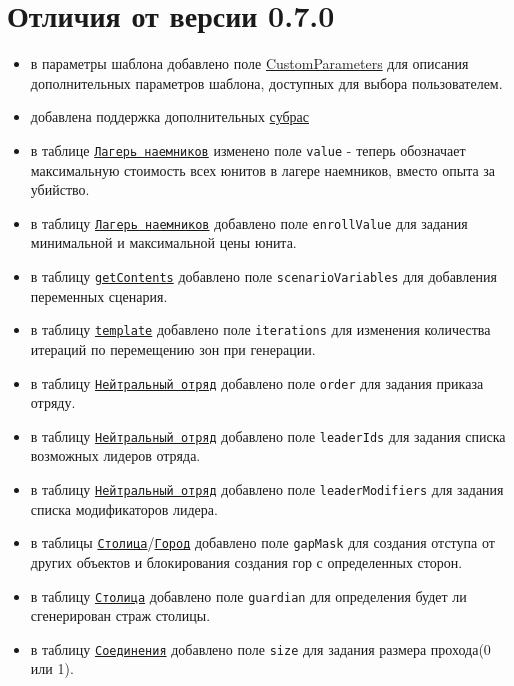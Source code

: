 \section{Отличия от версии 0.7.0}
\begin{itemize}
\item в параметры шаблона добавлено поле \hyperref[customParameters]{{CustomParameters}} для описания дополнительных параметров шаблона, доступных для выбора пользователем.
\item добавлена поддержка дополнительных \hyperref[subraceTypes]{субрас}
\item в таблице \hyperref[mercenary]{\texttt{Лагерь наемников}} изменено поле \texttt{value} - теперь обозначает максимальную стоимость всех юнитов в лагере наемников, вместо опыта за убийство.
\item в таблицу \hyperref[mercenary]{\texttt{Лагерь наемников}} добавлено поле \texttt{enrollValue} для задания минимальной и максимальной цены юнита.
\item в таблицу \hyperref[getContents]{\texttt{getContents}} добавлено поле \texttt{scenarioVariables} для добавления переменных сценария.
\item в таблицу \hyperref[template]{\texttt{template}} добавлено поле \texttt{iterations} для изменения количества итераций по перемещению зон при генерации.
\item в таблицу \hyperref[neutralStacks]{\texttt{Нейтральный отряд}} добавлено поле \texttt{order} для задания приказа отряду.
\item в таблицу \hyperref[neutralStacks]{\texttt{Нейтральный отряд}} добавлено поле \texttt{leaderIds} для задания списка возможных лидеров отряда.
\item в таблицу \hyperref[neutralStacks]{\texttt{Нейтральный отряд}} добавлено поле \texttt{leaderModifiers} для задания списка модификаторов лидера.
\item в таблицы \hyperref[capital]{\texttt{Столица}}/\hyperref[city]{\texttt{Город}} добавлено поле \texttt{gapMask} для создания отступа от других объектов и блокирования создания гор с определенных сторон.
\item в таблицу \hyperref[capital]{\texttt{Столица}} добавлено поле \texttt{guardian} для определения будет ли сгенерирован страж столицы.
\item в таблицу \hyperref[connection]{\texttt{Соединения}} добавлено поле \texttt{size} для задания размера прохода(0 или 1).
\end{itemize}